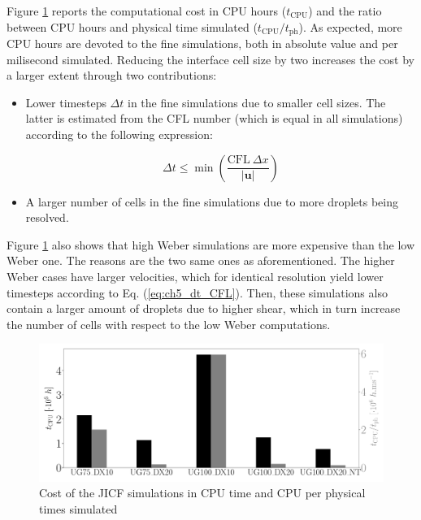 Figure \ref{fig:SLI_cost_convergence_all} reports the computational cost in CPU hours ($t_\mathrm{CPU}$) and the ratio between CPU hours and physical time simulated ($t_\mathrm{CPU}/t_\mathrm{ph}$). As expected, more CPU hours are devoted to the fine simulations, both in absolute value and per milisecond simulated. Reducing the interface cell size by two increases the cost by a larger extent through two contributions: 

\begin{itemize}

	\item Lower timesteps $\Delta t$ in the fine simulations due to smaller cell sizes. The latter is estimated from the CFL number (which is equal in all simulations) according to the following expression:

\begin{equation}
\label{eq:ch5_dt_CFL}
\Delta t \leq \min \left( \frac{\mathrm{CFL} ~   \Delta x }{|\textbf{u}|} \right)
\end{equation}

	\item A larger number of cells in the fine simulations due to more droplets being resolved.

\end{itemize}

Figure \ref{fig:SLI_cost_convergence_all} also shows that high Weber simulations are more expensive than the low Weber one. The reasons are the two same ones as aforementioned. The higher Weber cases have larger velocities, which for identical resolution yield lower timesteps according to Eq. (\ref{eq:ch5_dt_CFL}). Then, these simulations also contain a larger amount of droplets due to higher shear, which in turn increase the number of cells with respect to the low Weber computations.


\begin{figure}[ht]
	\centering
   \includegraphics[scale=0.225]{./part2_developments/figures_ch5_resolved_JICF/SLI_cost_for_convergence/cost_all_simulations}
   \caption{Cost of the JICF simulations in CPU time and CPU per physical times simulated}
   \label{fig:SLI_cost_convergence_all}
\end{figure}




